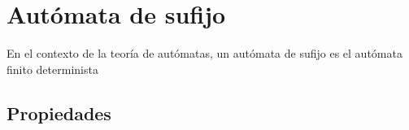 \section{Autómata de sufijo}\label{SuffixAutomaton}
En el contexto de la teoría de autómatas, un autómata de sufijo es el autómata finito determinista

\subsection{Propiedades}

